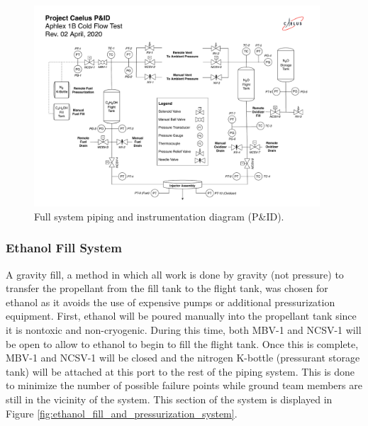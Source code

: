 \documentclass[9pt]{article} %
\numberwithin{equation}{section} %
\begin{document}
\begin{figure}[!htb]
    \centering
    \includegraphics[scale=0.5, width=0.95\textwidth, trim={0.5cm 0cm 0.5cm 3.9cm}, clip]{Aphlex1B_04-02-2020_P&ID.pdf} %
    \caption{Full system piping and instrumentation diagram (P\&ID).}
\end{figure}

\subsubsection{Ethanol Fill System}
\hspace{\parindent} A gravity fill, a method in which all work is done by gravity (not pressure) to transfer the propellant from the fill tank to the flight tank, was chosen for ethanol as it avoids the use of expensive pumps or additional pressurization equipment. First, ethanol will be poured manually into the propellant tank since it is nontoxic and non-cryogenic. During this time, both MBV-1 and NCSV-1 will be open to allow to ethanol to begin to fill the flight tank. Once this is complete, MBV-1 and NCSV-1 will be closed and the nitrogen K-bottle (pressurant storage tank) will be attached at this port to the rest of the piping system. This is done to minimize the number of possible failure points while ground team members are still in the vicinity of the system. This section of the system is displayed in Figure \ref{fig:ethanol_fill_and_pressurization_system}.
\end{document}
